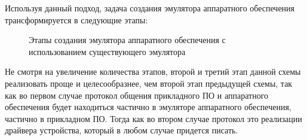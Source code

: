 Используя данный подход, задача создания эмулятора аппаратного обеспечения трансформируется в следующие этапы:
\begin{figure}[!htbp]
    \centering
    \caption{Этапы создания эмулятора аппаратного обеспечения с использованием существующего эмулятора}\label{fig:emu-creation-pro}
\end{figure}


Не смотря на увеличение количества этапов, второй и третий этап данной схемы реализовать проще и
целесообразнее, чем второй этап предыдущей схемы, так как во первом случае
протокол общения прикладного ПО и аппаратного обеспечения будет находиться частично в
эмуляторе аппаратного обеспечения, частично в прикладном ПО.
Тогда как во втором случае протокол это реализации драйвера устройства, который в любом случае придется писать.

